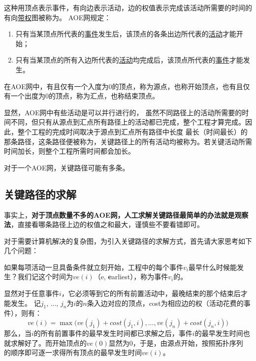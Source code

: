 这种用顶点表示事件，有向边表示活动，边的权值表示完成该活动所需要的时间的有向\uline{带权}图被称为。
AOE网规定：
\begin{enumerate}[label=\arabic*）]
    \item 只有当某顶点所代表的\uline{事件}发生后，该顶点的各条出边所代表的\uline{活动}才能开始；
    \item 只有当某顶点的所有入边所代表的\uline{活动}均完成后，该顶点所代表的\uline{事件}才能发生。
\end{enumerate}

在AOE网中，有且仅有一个入度为0的顶点，称为源点，也称开始顶点，也有且仅有一个出度为0的顶点，称为汇点，也称结束顶点。

显然，AOE网中有些活动是可以并行进行的，
虽然不同路径上的活动所需要的时间不同，但只有从源点到汇点所有路径上的活动都已完成，整个工程才算完成。因此，整个工程的完成时间取决于源点到汇点所有路径中长度
最长（时间最长）的那条路径，这条路径便被称为，关键路径上的所有活动均被称为。若关键活动所需时间加长，则整个工程所需时间都会加长。

对于一个AOE网，关键路径可能有多条。

\subsection{关键路径的求解}
事实上，\textbf{对于顶点数量不多的AOE网，人工求解关键路径最简单的办法就是观察法}，直接看哪条路径上边的权值之和最大，谨慎些不要看错即可。

对于需要计算机解决的复杂图，为引入关键路径的求解方式，首先请大家思考如下几个问题：

如果每项活动一旦具备条件就立刻开始，工程中的每个事件$v_i$最早什么时候能发生？我们记这个时间为$ve(i)$（e, \textbf{e}arliest），称为事件$v_i$的。

显然对于任意事件$i$，它必须等到它的所有前置活动中，最晚结束的那个结束后才能发生。
记$j_1$, ..., $j_n$为$i$的$n$条入边对应的顶点，cost为相应边的权（活动花费的事件），则有：
\[
    ve(i) = \max \bigl( ve(j_1) + cost(j_1, i), ..., ve(j_n) + cost(j_n, i) \bigr)
\]
那么，当$i$的所有前置事件的最早发生时间都已求解之后，事件$i$的最早发生时间也就求解好了。而开始顶点的$ve(0)$显然为0，于是，由源点开始，按照拓扑序列
的顺序即可逐一求得所有顶点的最早发生时间$ve(i)$。


